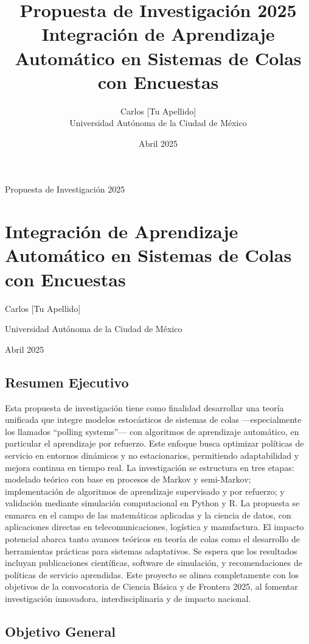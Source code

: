 \documentclass[12pt]{article}
\title{Propuesta de Investigación 2025\\Integración de Aprendizaje Automático en Sistemas de Colas con Encuestas}
\author{Carlos [Tu Apellido]\\Universidad Autónoma de la Ciudad de México}
\date{Abril 2025}
\begin{document}
\maketitle

Propuesta de Investigación 2025

\section*{Integración de Aprendizaje Automático en Sistemas de Colas con Encuestas}

Carlos [Tu Apellido]

Universidad Autónoma de la Ciudad de México

Abril 2025

\subsection*{Resumen Ejecutivo}

Esta propuesta de investigación tiene como finalidad desarrollar una teoría unificada que integre modelos estocásticos de sistemas de colas —especialmente los llamados “polling systems”— con algoritmos de aprendizaje automático, en particular el aprendizaje por refuerzo. Este enfoque busca optimizar políticas de servicio en entornos dinámicos y no estacionarios, permitiendo adaptabilidad y mejora continua en tiempo real. La investigación se estructura en tres etapas: modelado teórico con base en procesos de Markov y semi-Markov; implementación de algoritmos de aprendizaje supervisado y por refuerzo; y validación mediante simulación computacional en Python y R. La propuesta se enmarca en el campo de las matemáticas aplicadas y la ciencia de datos, con aplicaciones directas en telecomunicaciones, logística y manufactura. El impacto potencial abarca tanto avances teóricos en teoría de colas como el desarrollo de herramientas prácticas para sistemas adaptativos. Se espera que los resultados incluyan publicaciones científicas, software de simulación, y recomendaciones de políticas de servicio aprendidas. Este proyecto se alinea completamente con los objetivos de la convocatoria de Ciencia Básica y de Frontera 2025, al fomentar investigación innovadora, interdisciplinaria y de impacto nacional.

\subsection*{Objetivo General}
\end{document}
